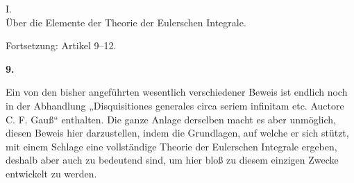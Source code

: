 \documentclass[11pt]{article}
\newcommand{\art}[1]{\bigskip\begin{center}\large\bfseries #1.\end{center}\nopagebreak}
\begin{document}
\begin{center}
{\Large I.\\[0.4em] Über die Elemente der Theorie der Eulerschen Integrale.}\par
\medskip
{\normalsize Fortsetzung: Artikel 9--12.}
\end{center}

\art{9}

Ein von den bisher angeführten wesentlich verschiedener Beweis ist endlich noch in der Abhandlung „Disquisitiones generales circa seriem infinitam etc. Auctore C. F. Gauß“ enthalten. Die ganze Anlage derselben macht es aber unmöglich, diesen Beweis hier darzustellen, indem die Grundlagen, auf welche er sich stützt, mit einem Schlage eine vollständige Theorie der Eulerschen Integrale ergeben, deshalb aber auch zu bedeutend sind, um hier bloß zu diesem einzigen Zwecke entwickelt zu werden.
\end{document}

